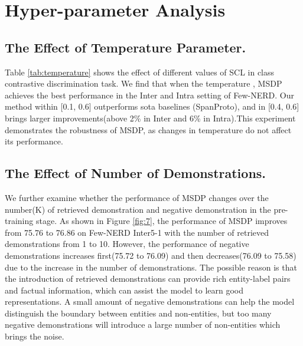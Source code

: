 \documentclass[sigconf,natbib=true,anonymous=False]{acmart}
\begin{document}
   











 








\section{Hyper-parameter Analysis}
\subsection{The Effect of Temperature Parameter.} Table \ref{tab:temperature} shows the effect of different  values of SCL in class contrastive discrimination task. We find that when the temperature , MSDP achieves the best performance in the Inter and Intra setting of Few-NERD. Our method within  [0.1, 0.6] outperforms sota baselines (SpanProto), and  in [0.4, 0.6] brings larger improvements(above 2\% in Inter and 6\% in Intra).This experiment demonstrates the robustness of MSDP, as changes in temperature  do not affect its performance.



\subsection{The Effect of Number of Demonstrations.} We further examine whether the performance of MSDP changes over the number(K) of retrieved demonstration and negative demonstration in the pre-training stage. As shown in Figure \ref{fig:7}, the performance of MSDP improves from 75.76 to 76.86 on Few-NERD Inter5-1 with the number of retrieved demonstrations from 1 to 10. However, the performance of negative demonstrations increases first(75.72 to 76.09) and then decreases(76.09 to 75.58) due to the increase in the number of demonstrations. The possible reason is that the introduction of retrieved demonstrations can provide rich entity-label pairs and factual information, which can assist the model to learn good representations. A small amount of negative demonstrations can help the model distinguish the boundary between entities and non-entities, but too many negative demonstrations will introduce a large number of non-entities which brings the noise.
\end{document}
